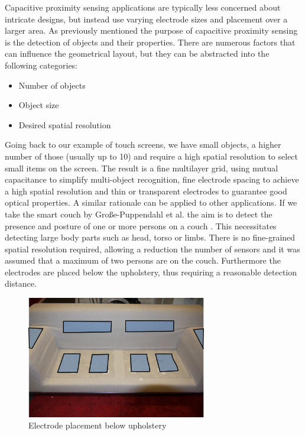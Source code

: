 Capacitive proximity sensing applications are typically less concerned about intricate designs, but instead use varying electrode sizes and placement over a larger area. As previously mentioned the purpose of capacitive proximity sensing is the detection of objects and their properties. There are numerous factors that can influence the geometrical layout, but they can be abstracted into the following categories:
\begin{itemize}
\item	Number of objects
\item	Object size
\item	Desired spatial resolution
\end{itemize}
Going back to our example of touch screens, we have small objects, a higher number of those (usually up to 10) and require a high spatial resolution to select small items on the screen. The result is a fine multilayer grid, using mutual capacitance to simplify multi-object recognition, fine electrode spacing to achieve a high spatial resolution and thin or transparent electrodes to guarantee good optical properties. A similar rationale can be applied to other applications. If we take the smart couch by Große-Puppendahl et al. the aim is to detect the presence and posture of one or more persons on a couch \cite{Couch2011}. This necessitates detecting large body parts such as head, torso or limbs. There is no fine-grained spatial resolution required, allowing a reduction the number of sensors and it was assumed that a maximum of two persons are on the couch. Furthermore the electrodes are placed below the upholstery, thus requiring a reasonable detection distance. 
\begin{figure} [h]
\centering
\includegraphics[width=0.7\textwidth]{images/couch_electrodes.png} 
\caption{Electrode placement below upholstery \cite{Couch2011}}
\label{fig:couch_electrodes}
\end{figure}
